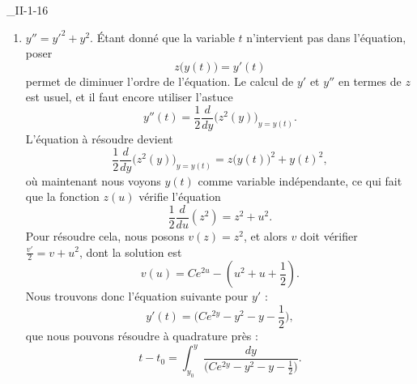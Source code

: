 

\begin{corrige}{_II-1-16}

\begin{enumerate}

\item
$y''=y'^2+y^2$.
Étant donné que la variable $t$ n'intervient pas dans l'équation, poser
\begin{equation}
	z\big( y(t) \big)=y'(t)
\end{equation}
permet de diminuer l'ordre de l'équation. Le calcul de $y'$ et $y''$ en termes de $z$ est usuel, et il faut encore utiliser l'astuce
\begin{equation}
	y''(t)=\frac{ 1 }{2}\frac{ d }{ dy }\Big( z^2(y) \Big)_{y=y(t)}.
\end{equation}
L'équation à résoudre devient
\begin{equation}
	\frac{ 1 }{2}\frac{ d }{ dy }\Big( z^2(y) \Big)_{y=y(t)}=z\big( y(t) \big)^2+y(t)^2,
\end{equation}
où maintenant nous voyons $y(t)$ comme variable indépendante, ce qui fait que la fonction $z(u)$ vérifie l'équation
\begin{equation}
	\frac{ 1 }{2}\frac{ d }{ du }(z^2)=z^2+u^2.
\end{equation}
Pour résoudre cela, nous posons $v(z)=z^2$, et alors $v$ doit vérifier $\frac{ v' }{ 2 }=v+u^2$, dont la solution est
\begin{equation}
	v(u)=C e^{2u}-(u^2+u+\frac{ 1 }{2}).
\end{equation}
Nous trouvons donc l'équation suivante pour $y'$ :
\begin{equation}
	y'(t)=\big( C e^{2y}-y^2-y-\frac{ 1 }{2} \big),
\end{equation}
que nous pouvons résoudre à quadrature près :
\begin{equation}
	t-t_0=\int_{y_0}^y\frac{ dy }{ \big( C e^{2y}-y^2-y-\frac{ 1 }{2} \big) }.
\end{equation}



\end{enumerate}
\end{corrige}
